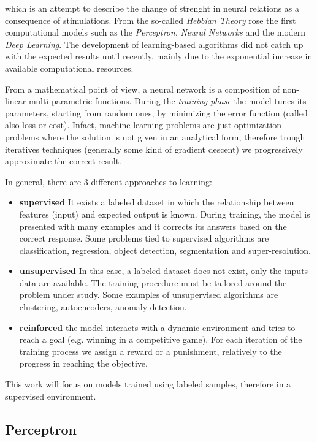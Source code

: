 \documentclass[12pt,a4paper]{report}
\begin{document}
which is an attempt to describe the change of strenght in neural relations as a consequence of stimulations.
From the so-called \textit{Hebbian Theory} rose the first computational models such as the \textit{Perceptron}, \textit{Neural Networks} and the modern \textit{Deep Learning}. 
The development of learning-based algorithms did not catch up with the expected results until recently, mainly due to the exponential increase in available computational resources.

From a mathematical point of view, a neural network is a composition of non-linear multi-parametric functions. 
During the {\it training phase} the model tunes its parameters, starting from random ones, by minimizing the error function (called also loss or cost). 
Infact, machine learning problems are just optimization problems where the solution is not given in an analytical form, therefore trough iteratives techniques (generally some kind of gradient descent) we progressively approximate the correct result.

In general, there are 3 different approaches to learning:

\begin{itemize}
 \item {\bf supervised} It exists a labeled dataset in which the relationship between features (input) and expected output is known. 
 During training, the model is presented with many examples and it corrects its answers based on the correct response.  
 Some problems tied to supervised algorithms are classification, regression, object detection, segmentation and super-resolution.
 \item {\bf unsupervised} In this case, a labeled dataset does not exist, only the inputs data are available. 
 The training procedure must be tailored around the problem under study. Some examples of unsupervised algorithms are clustering, autoencoders, anomaly detection.
 \item {\bf reinforced} the model interacts with a dynamic environment and tries to reach a goal (e.g. winning in a competitive game). 
 For each iteration of the training process we assign a reward or a punishment, relatively to the progress in reaching the objective.
\end{itemize}

This work will focus on models trained using labeled samples, therefore in a supervised environment.

\subsection*{Perceptron}
\end{document}
